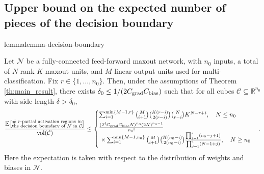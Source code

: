 \documentclass{article}
\theoremstyle{definition}
\newcommand{\cbias}{C_{\text{\normalfont bias}}}
\newcommand{\cgrad}{C_{\text{\normalfont grad}}}
\newcommand{\net}{\mathcal{N}}
\newcommand{\nin}{n_0}
\newcommand{\vol}{\operatorname{vol}}
\begin{document}
\subsection{Upper bound on the expected number of pieces of the decision boundary}
\begin{restatable}{lemma}{lemma-decision-boundary}
    \label{lem:decision_boundary}
    
    Let $\net$ be a fully-connected feed-forward maxout network, with $\nin$ inputs, a total of $N$ rank $K$ maxout units, and $M$ linear output units used for multi-classification. 
    Fix $r \in \{1, \dots, \nin\}$.
    Then, under the assumptions of Theorem \ref{th:main_result}, there exists $\delta_0\leq 1/(2 \cgrad \cbias)$ such that for all cubes $\mathcal{C}\subseteq\mathbb{R}^{\nin}$ with side length $\delta>\delta_0$,
    \begin{align*}
        \frac{\mathbb{E}\big[\substack{\# \text{ \normalfont$r$-partial activation regions in} \\ \text{\normalfont the decision boundary of } \mathcal{N} \text{ \normalfont in } \mathcal{C}}\big]}{\vol(\mathcal{C})} \leq
        \begin{cases}
            \sum_{i = 1}^{\min\{M - 1, r\}}  \binom{M}{i + 1}  \binom{K(r - i)}{2 (r - i)} \binom{N}{r - i} K^{N - r + i} , \quad N \leq \nin
            \\[5pt]
            \frac{(2^4 \cgrad \cbias N)^{\nin} (2 K)^{\nin - 1} }{\nin!}\\
            \ \times \sum_{i = 1}^{\min\{M - 1, \nin\}}  \binom{M}{i + 1}  \binom{K(\nin - i)}{2 (\nin - i)} \frac{\prod_{j=1}^{i}(\nin - j + 1)}{\prod_{j=1}^{i}(N - 1 + j)}, \quad N \geq \nin
        \end{cases}.
    \end{align*}
    Here the expectation is taken with respect to the distribution of weights and biases in $\net$. 
\end{restatable}
\end{document}
